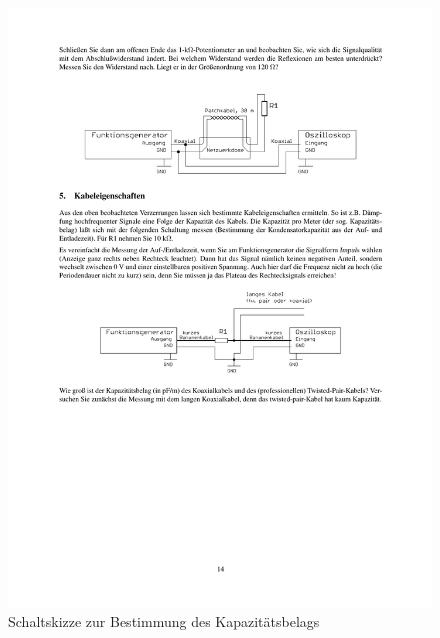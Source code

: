 \documentclass[12pt,a4paper]{article}
\begin{document}
\begin{figure}[H] 
  \centering
    \includegraphics[trim = 10mm 110mm 10mm 140mm, clip, scale = 1]{4-5.pdf}
  	\caption[Schaltskizze zur Bestimmung des Kapazitätsbelags]{Schaltskizze zur Bestimmung des Kapazitätsbelags\footnotemark}
  \label{fig:5}
\end{figure}
\end{document}
